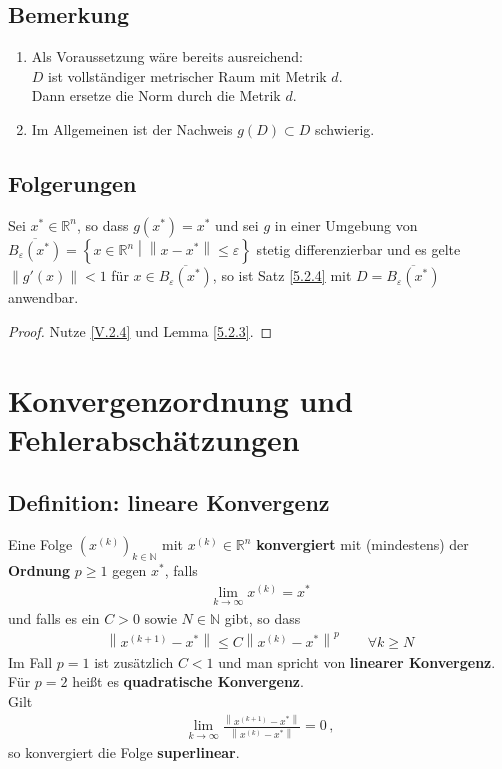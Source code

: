 \documentclass[ngerman,fontsize=11pt, paper=a4, parskip=half, titlepage=true, toc=bib]{scrbook}
\newcommand{\R}{\mathds{R}}
\newcommand{\N}{\mathds{N}}
\newcommand{\nn}[1]{\left\| #1 \right\|}
\newcommand{\sectione}[1]{\section{#1} \setcounter{equation}{0}}
\begin{document}
		\subsection{Bemerkung}\label{5.2.5}
		\begin{enumerate}[1)]
			\item Als Voraussetzung wäre bereits ausreichend:\\
			$D$ ist vollständiger metrischer Raum mit Metrik $d$. \\
			Dann ersetze die Norm durch die Metrik $d$.
			\item Im Allgemeinen ist der Nachweis $g(D)\subset D$ schwierig.
		\end{enumerate}
		
		
	
	\subsection{Folgerungen}\label{5.2.6}
	Sei $x^{*}\in \R^n$, so dass $g(x^{*})=x^{*}$ und sei $g$ in einer Umgebung von 
	$\overline{B_\varepsilon(x^{*})}=\left\{ x\in \R^n \middle\vert \nn{x-x^{*}}\leq \varepsilon \right\}$ stetig differenzierbar und es gelte $\nn{g'(x)}<1$ für $x\in \overline{B_\varepsilon(x^{*})}$,
	so ist Satz \ref{5.2.4} mit $D=\overline{B_\varepsilon(x^{*})}$ anwendbar.
	
	\begin{proof}
		Nutze \eqref{V.2.4} und Lemma \ref{5.2.3}.
	\end{proof}
	
	\sectione{Konvergenzordnung und Fehlerabschätzungen}
	
	\subsection{Definition: lineare Konvergenz}\label{5.3.1}
	Eine Folge $(x^{(k)})_{k\in\N} $ mit $x^{(k)}\in\R^n$ \textbf{konvergiert} mit (mindestens)
	der \textbf{Ordnung} $p\geq 1$ gegen $x^{*}$, falls
	\begin{gather*}
		\lim\limits_{k\rightarrow \infty}x^{(k)}=x^{*}
	\end{gather*}
	und falls es ein $C>0$ sowie $N\in\N$ gibt, so dass
	\begin{gather*}
		\nn{x^{(k+1)}-x^{*}} \leq C \nn{x^{(k)}-x^{*}}^p\qquad \forall k\geq N 
	\end{gather*}
	Im Fall $p=1$ ist zusätzlich $C<1$ und man spricht von \textbf{linearer Konvergenz}. \\
	Für $p=2$ heißt es \textbf{quadratische Konvergenz}.
	\\Gilt 
	\begin{gather*} 
		\lim\limits_{k\rightarrow \infty}\frac{\nn{x^{(k+1)}-x^{*}}}{\nn{x^{(k)}-x^{*}}} = 0\, ,
	\end{gather*} so konvergiert die Folge \textbf{superlinear}.
\end{document}
